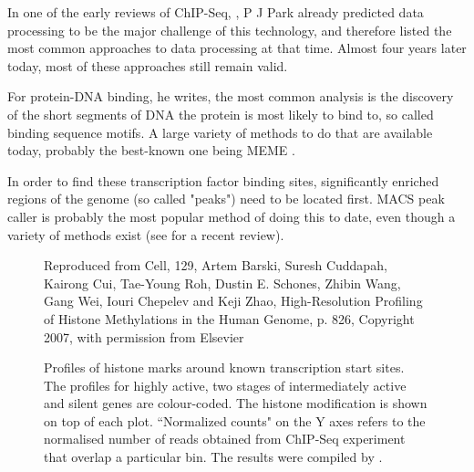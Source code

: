 \documentclass[parskip]{cs4rep}
\begin{document}
In one of the early reviews of ChIP-Seq, \cite{Park:2009wc}, P J Park already predicted data processing to be the major challenge of this technology, and therefore listed the most common approaches to data processing at that time. Almost four years later today, most of these approaches still remain valid.

For protein-DNA binding, he writes, the most common analysis is the discovery of the short segments of DNA the protein is most likely to bind to, so called binding sequence motifs. A large variety of methods to do that are available today, probably the best-known one being MEME \cite{Grundy:1997vb}.

In order to find these transcription factor binding sites, significantly enriched regions of the genome (so called "peaks") need to be located first. MACS peak caller \cite{Zhang:2008wp} is probably the most popular method of doing this to date, even though a variety of methods exist (see \cite{Furey:2012ha} for a recent review).

\begin{figure}[p]
   \centering
   {Reproduced from Cell, 129, Artem Barski, Suresh Cuddapah, Kairong Cui, Tae-Young Roh, Dustin E. Schones, Zhibin Wang, Gang Wei, Iouri Chepelev and Keji Zhao, High-Resolution Profiling of Histone Methylations in the Human Genome\cite{Barski:2007ww}, p. 826, Copyright 2007, with permission from Elsevier}
   \caption{Profiles of histone marks around known transcription start sites. The profiles for highly active, two stages of intermediately active and silent genes are colour-coded. The histone modification is shown on top of each plot. ``Normalized counts" on the Y axes refers to the normalised number of reads obtained from ChIP-Seq experiment that overlap a particular bin. The results were compiled by \cite{Barski:2007ww}.}
    \label{fig:motivation:histone_profiles}
\end{figure}
\end{document}
